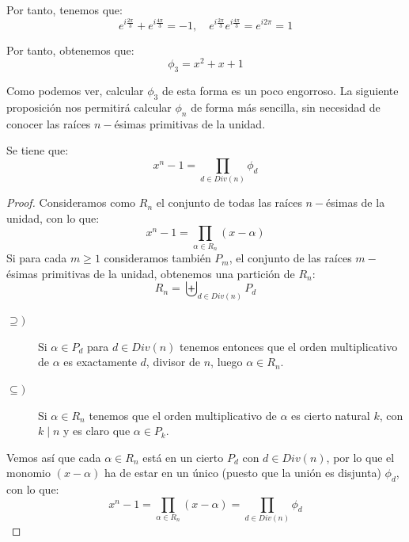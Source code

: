 \begin{ejemplo}
    Por tanto, tenemos que:
    \begin{equation*}
        e^{i\frac{2\pi}{3}} + e^{i\frac{4\pi}{3}} = -1, \quad e^{i\frac{2\pi}{3}}e^{i\frac{4\pi}{3}} = e^{i2\pi} = 1
    \end{equation*}

    Por tanto, obtenemos que:
    \begin{equation*}
        \phi_3 = x^2+x+1
    \end{equation*}

    Como podemos ver, calcular $\phi_3$ de esta forma es un poco engorroso. La siguiente proposición nos permitirá calcular $\phi_n$ de forma más sencilla, sin necesidad de conocer las raíces $n-$ésimas primitivas de la unidad.
\end{ejemplo}

\begin{prop}\label{prop:formula_ciclotomico}
    Se tiene que:
    \begin{equation*}
        x^n-1 = \prod_{d \in Div(n)}\phi_d
    \end{equation*}
    \begin{proof}
        Consideramos como $R_n$ el conjunto de todas las raíces $n-$ésimas de la unidad, con lo que: 
        \begin{equation*}
            x^n - 1 = \prod_{\alpha \in R_n}(x-\alpha)
        \end{equation*}
        Si para cada $m\geq 1$ consideramos también $P_m$, el conjunto de las raíces $m-$ésimas primitivas de la unidad, obtenemos una partición de $R_n$:
        \begin{equation*}
            R_n = \biguplus_{d\in Div(n)}P_d
        \end{equation*}
        \begin{description}
            \item [$\supseteq)$] Si $\alpha \in P_d$ para $d\in Div(n)$ tenemos entonces que el orden multiplicativo de $\alpha$ es exactamente $d$, divisor de $n$, luego $\alpha \in R_n$.
            \item [$\subseteq)$] Si $\alpha \in R_n$ tenemos que el orden multiplicativo de $\alpha$ es cierto natural $k$, con $k\mid n$ y es claro que $\alpha \in P_k$.
        \end{description}
        Vemos así que cada $\alpha\in R_n$ está en un cierto $P_d$ con $d\in Div(n)$, por lo que el monomio $(x-\alpha)$ ha de estar en un único (puesto que la unión es disjunta) $\phi_d$, con lo que:
        \begin{equation*}
            x^n - 1 = \prod_{\alpha \in R_n}(x-\alpha) = \prod_{d\in Div(n)}\phi_d
        \end{equation*}
    \end{proof}
\end{prop}

